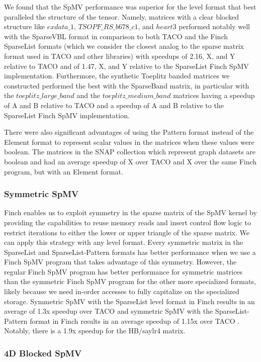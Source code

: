 \documentclass[acmsmall]{acmart}
\begin{document}
We found that the SpMV performance was superior for the level format that best paralleled the structure of the tensor. Namely, matrices with a clear blocked structure like $exdata\_1$, $TSOPF\_RS\_b678\_c1$, and $heart3$ performed notably well with the SparseVBL format in comparison to both TACO and the Finch SparseList formats (which we consider the closest analog to the sparse matrix format used in TACO and other libraries) with speedups of 2.16, X, and Y relative to TACO and of 1.47, X, and Y relative to the SparseList Finch SpMV implementation. Furthermore, the synthetic Toeplitz banded matrices we constructed performed the best with the SparseBand matrix, in particular with the $toeplitz\_large\_band$ and the $toeplitz\_medium\_band$ matrices having a speedup of A and B relative to TACO and a speedup of A and B relative to the SparseList Finch SpMV implementation. 

There were also significant advantages of using the Pattern format instead of the Element format to represent scalar values in the matrices when these values were boolean. The matrices in the SNAP collection which represent graph datasets are boolean and had an average speedup of X over TACO and X over the same Finch program, but with an Element format.   


\subsubsection{Symmetric SpMV}
Finch enables us to exploit symmetry in the sparse matrix of the SpMV kernel by providing the capabilities to reuse memory reads and insert control flow logic to restrict iterations to either the lower or upper triangle of the sparse matrix. We can apply this strategy with any level format. Every symmetric matrix in the SparseList and SparseList-Pattern formats has better performance when we use a Finch SpMV program that takes advantage of this symmetry. However, the regular Finch SpMV program has better performance for symmetric matrices than the symmetric Finch SpMV program for the other more specialized formats, likely because we need in-order accesses to fully capitalize on the specialized storage. Symmetric SpMV with the SparseList level format in Finch results in an average of 1.3x speedup over TACO and symmetric SpMV with the SparseList-Pattern format in Finch results in an average speedup of 1.15x over TACO . Notably, there is a 1.9x speedup for the HB/saylr4 matrix. 
\subsubsection{4D Blocked SpMV}
\end{document}
